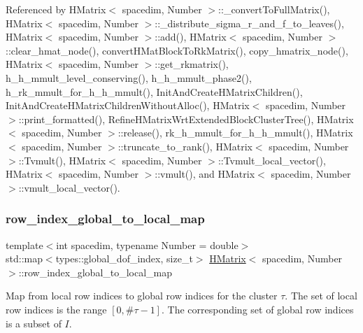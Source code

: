 Referenced by H\+Matrix$<$ spacedim, Number $>$\+::\+\_\+convert\+To\+Full\+Matrix(), H\+Matrix$<$ spacedim, Number $>$\+::\+\_\+distribute\+\_\+sigma\+\_\+r\+\_\+and\+\_\+f\+\_\+to\+\_\+leaves(), H\+Matrix$<$ spacedim, Number $>$\+::add(), H\+Matrix$<$ spacedim, Number $>$\+::clear\+\_\+hmat\+\_\+node(), convert\+H\+Mat\+Block\+To\+Rk\+Matrix(), copy\+\_\+hmatrix\+\_\+node(), H\+Matrix$<$ spacedim, Number $>$\+::get\+\_\+rkmatrix(), h\+\_\+h\+\_\+mmult\+\_\+level\+\_\+conserving(), h\+\_\+h\+\_\+mmult\+\_\+phase2(), h\+\_\+rk\+\_\+mmult\+\_\+for\+\_\+h\+\_\+h\+\_\+mmult(), Init\+And\+Create\+H\+Matrix\+Children(), Init\+And\+Create\+H\+Matrix\+Children\+Without\+Alloc(), H\+Matrix$<$ spacedim, Number $>$\+::print\+\_\+formatted(), Refine\+H\+Matrix\+Wrt\+Extended\+Block\+Cluster\+Tree(), H\+Matrix$<$ spacedim, Number $>$\+::release(), rk\+\_\+h\+\_\+mmult\+\_\+for\+\_\+h\+\_\+h\+\_\+mmult(), H\+Matrix$<$ spacedim, Number $>$\+::truncate\+\_\+to\+\_\+rank(), H\+Matrix$<$ spacedim, Number $>$\+::\+Tvmult(), H\+Matrix$<$ spacedim, Number $>$\+::\+Tvmult\+\_\+local\+\_\+vector(), H\+Matrix$<$ spacedim, Number $>$\+::vmult(), and H\+Matrix$<$ spacedim, Number $>$\+::vmult\+\_\+local\+\_\+vector().

\mbox{\label{classHMatrix_a4d64145335fc0521603b206a22a67578}} 
\subsubsection{\texorpdfstring{row\+\_\+index\+\_\+global\+\_\+to\+\_\+local\+\_\+map}{row\_index\_global\_to\_local\_map}}
{\footnotesize\ttfamily template$<$int spacedim, typename Number = double$>$ \\
std\+::map$<$types\+::global\+\_\+dof\+\_\+index, size\+\_\+t$>$ \hyperlink{classHMatrix}{H\+Matrix}$<$ spacedim, Number $>$\+::row\+\_\+index\+\_\+global\+\_\+to\+\_\+local\+\_\+map\hspace{0.3cm}{\ttfamily [private]}}

Map from local row indices to global row indices for the cluster $\tau$. The set of local row indices is the range $[0, \#\tau - 1]$. The corresponding set of global row indices is a subset of $I$.



